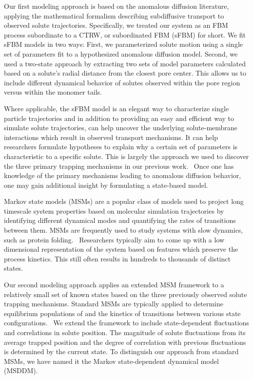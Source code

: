 \documentclass{article}
\begin{document}
  Our first modeling approach is based on the anomalous diffusion literature, 
  applying the mathematical formalism describing subdiffusive transport to observed
  solute trajectories. Specifically, we treated our system as an FBM process subordinate
  to a CTRW, or subordinated FBM (sFBM) for short. We fit sFBM
  models in two ways: First, we parameterized solute motion using a single set of parameters fit
  to a hypothesized anomalous diffusion model. Second, we used a two-state approach
  by extracting two sets of model parameters calculated based on a solute's radial
  distance from the closest pore center. This allows us to include different dynamical
  behavior of solutes observed within the pore region versus within the monomer tails.
  
  Where applicable, the sFBM model is an elegant way to characterize single 
  particle trajectories and in addition to providing an easy and efficient way to 
  simulate solute trajectories, can help uncover the underlying solute-membrane
  interactions which result in observed transport mechanisms. It can help 
  researchers formulate hypotheses to explain why a certain set of parameters is
  characteristic to a specific solute. 
  This is largely the approach we used to
  discover the three primary trapping mechanisms in our previous work.~\cite{coscia_chemically_2019}
  Once one has knowledge of the primary mechanisms leading to anomalous diffusion
  behavior, one may gain additional insight by formulating a state-based model.

  Markov state models (MSMs) are a popular class of models used to project long timescale
  system properties based on molecular simulation trajectories by identifying
  different dynamical modes and quantifying the rates of transitions between them.
  MSMs are frequently used to study systems with slow dynamics, such as protein 
  folding.~\cite{snow_how_2005,chodera_automatic_2007} Researchers typically aim to 
  come up with a low dimensional representation of the system based on features 
  which preserve the process kinetics. This still often results in hundreds to thousands
  of distinct states.~\cite{chodera_markov_2014}

  Our second modeling approach applies an extended MSM framework to a relatively 
  small set of known states based on the three previously observed solute trapping mechanisms.  
  Standard MSMs are typically applied to determine equilibrium populations
  of and the kinetics of transitions between various state configurations.~\cite{bowman_using_2009} 
  We extend the framework to include state-dependent fluctuations and correlations in 
  solute position. The magnitude of solute fluctuations from its average trapped 
  position and the degree of correlation with previous fluctuations is 
  determined by the current state. To distinguish our approach from standard MSMs, we have
  named it the Markov state-dependent dynamical model (MSDDM).
  
\end{document}
